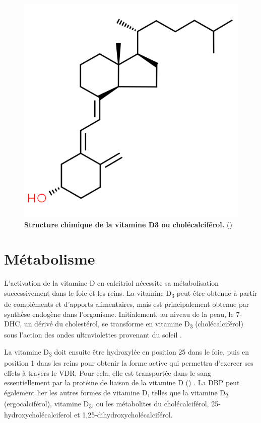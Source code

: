 \documentclass[
  a4paper,
  DIV=11,
  numbers=noendperiod,
  listof=totoc]{scrreprt}
\begin{document}
\begin{figure}
\centering
\includegraphics[width=0.7\columnwidth]{figures/cholecalciferol-chemspider.png} 
\caption[Structure chimique de la vitamine D3 ou cholécalciférol.]{\textbf{Structure chimique de la vitamine D3 ou cholécalciférol.} (\cite{chemspider.2023})}
\label{fig:vitd3}
\end{figure}

\section{Métabolisme}\label{muxe9tabolisme}

L'activation de la vitamine D en calcitriol nécessite sa métabolisation
successivement dans le foie et les reins. La vitamine D\textsubscript{3}
peut être obtenue à partir de compléments et d'apports alimentaires,
mais est principalement obtenue par synthèse endogène dans l'organisme.
Initialement, au niveau de la peau, le \ac{7-DHC}, un dérivé du
cholestérol, se transforme en vitamine D\textsubscript{3}
(cholécalciférol) sous l'action des ondes ultraviolettes provenant du
soleil \autocite{Bikle.2014}.

La vitamine D\textsubscript{3} doit ensuite être hydroxylée en position
25 dans le foie, puis en position 1 dans les reins pour obtenir la forme
active qui permettra d'exercer ses effets à travers le \ac{VDR}. Pour
cela, elle est transportée dans le sang essentiellement par la protéine
de liaison de la vitamine D ()
\autocite{Christakos.2010,Chun.2012}. La \ac{DBP} peut également lier
les autres formes de vitamine D, telles que la vitamine
D\textsubscript{2} (ergocalciférol), vitamine D\textsubscript{3}, ou les
métabolites du cholécalciférol, 25-hydroxycholécalciferol et
1,25-dihydroxycholécalciférol.
\end{document}
